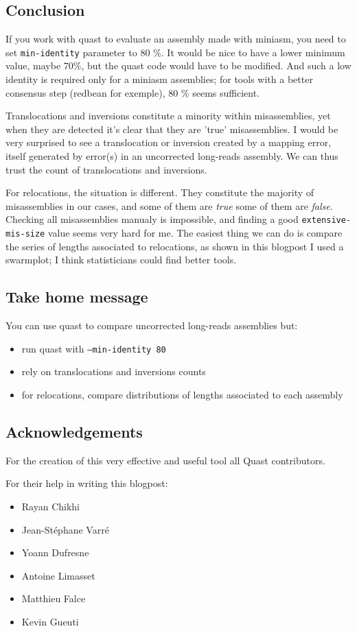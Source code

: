 \documentclass[./main.tex]{subfiles}
\begin{document}
\subsection{Conclusion}

If you work with quast to evaluate an assembly made with miniasm, you
need to set \texttt{min-identity} parameter to 80 \%. It would be nice
to have a lower minimum value, maybe 70\%, but the quast code would have
to be modified. And such a low identity is required only for a miniasm
assemblies; for tools with a better consensus step (redbean for
exemple), 80 \% seems sufficient.

Translocations and inversions constitute a minority within
misassemblies, yet when they are detected it's clear that they are
'true' misassemblies. I would be very surprised to see a translocation
or inversion created by a mapping error, itself generated by error(s) in
an uncorrected long-reads assembly. We can thus trust the count of
translocations and inversions.

For relocations, the situation is different. They constitute the
majority of misassemblies in our cases, and some of them are \emph{true}
some of them are \emph{false}. Checking all misassemblies manualy is
impossible, and finding a good \texttt{extensive-mis-size} value seems
very hard for me. The easiest thing we can do is compare the series of
lengths associated to relocations, as shown in this blogpost I used a
swarmplot; I think statisticians could find better tools.

\subsection{Take home message}

You can use quast to compare uncorrected long-reads assemblies but:

\begin{itemize}
\item run quast with \texttt{--min-identity 80}
\item rely on translocations and inversions counts
\item for relocations, compare distributions of lengths associated to each assembly
\end{itemize}

\subsection{Acknowledgements}

For the creation of this very effective and useful tool all Quast
contributors.

For their help in writing this blogpost:

\begin{itemize}
\item Rayan Chikhi
\item Jean-Stéphane Varré
\item Yoann Dufresne
\item Antoine Limasset
\item Matthieu Falce
\item Kevin Gueuti
\end{itemize}
\end{document}
